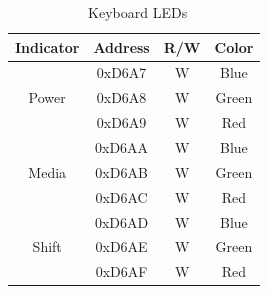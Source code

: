 \begin{table}[ht]
    \begin{center}
        \begin{tabular}{|c|c|c|c|} \hline
            Indicator & Address & R/W & Color \\\hline\hline
            \multirow{3}{*}{Power} & 0xD6A7 & W & Blue \\\cline{2-4}
                                   & 0xD6A8 & W & Green \\\cline{2-4}
                                   & 0xD6A9 & W & Red \\\hline

            \multirow{3}{*}{Media} & 0xD6AA & W & Blue \\\cline{2-4}
                                   & 0xD6AB & W & Green \\\cline{2-4}
                                   & 0xD6AC & W & Red \\\hline

            \multirow{3}{*}{Shift} & 0xD6AD & W & Blue \\\cline{2-4}
                                   & 0xD6AE & W & Green \\\cline{2-4}
                                   & 0xD6AF & W & Red \\\hline
        \end{tabular}
    \end{center}
    \caption{\fk\ Keyboard LEDs}
    \label{tab:f256k_kbd_leds}
\end{table}